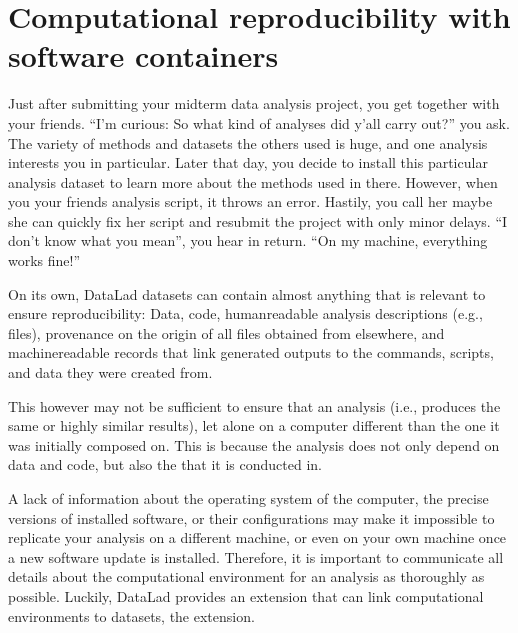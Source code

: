 \section{Computational reproducibility with software containers}
\label{\detokenize{basics/101-133-containersrun:computational-reproducibility-with-software-containers}}\label{\detokenize{basics/101-133-containersrun:containersrun}}\label{\detokenize{basics/101-133-containersrun::doc}}
\sphinxAtStartPar
Just after submitting your midterm data analysis project, you get together
with your friends. “I’m curious: So what kind of analyses did y’all carry out?”
you ask. The variety of methods and datasets the others used is huge, and
one analysis interests you in particular. Later that day, you decide to
install this particular analysis dataset to learn more about the methods used
in there. However, when you  your friends analysis script,
it throws an error. Hastily, you call her \textendash{} maybe she can quickly fix her
script and resubmit the project with only minor delays. “I don’t know what
you mean”, you hear in return.
“On my machine, everything works fine!”

\sphinxAtStartPar
On its own, DataLad datasets can contain almost anything that is relevant to
ensure reproducibility: Data, code, human\sphinxhyphen{}readable analysis descriptions
(e.g.,  files), provenance on the origin of all files
obtained from elsewhere, and machine\sphinxhyphen{}readable records that link generated
outputs to the commands, scripts, and data they were created from.

\sphinxAtStartPar
This however may not be sufficient to ensure that an analysis 
(i.e., produces the same or highly similar results), let alone  on a
computer different than the one it was initially composed on. This is because
the analysis does not only depend on data and code, but also the
 that it is conducted in.

\sphinxAtStartPar
A lack of information about the operating system of the computer, the precise
versions of installed software, or their configurations may
make it impossible to replicate your analysis on a different machine, or even
on your own machine once a new software update is installed. Therefore, it is
important to communicate all details about the computational environment for
an analysis as thoroughly as possible. Luckily, DataLad provides an extension
that can link computational environments to datasets, the
extension.

